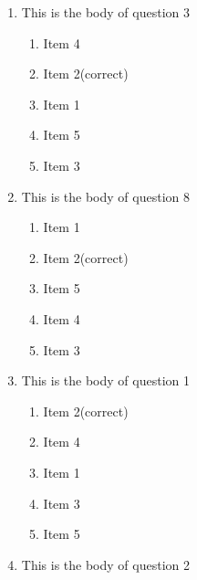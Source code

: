 \documentclass[amsfonts,bezier,leqno,fleqn,12pt,a4paper]{article}
\begin{document}
{{{\begin{large}
\begin{enumerate}
\begin{enumerate}
\item  Item 2\hfill {\small (correct)}
\item  Item 4
\item  Item 1
\item  Item 3
\item  Item 5

\end{enumerate}
\newpage


\item This is the body of question 3
\vspace {0.3in}
\setcounter{equation}{0}

\begin{enumerate}
\item  Item 4
\item  Item 2\hfill {\small (correct)}
\item  Item 1
\item  Item 5
\item  Item 3

\end{enumerate}

\vspace {3.5cm}


\item This is the body of question 8
\vspace {0.3in}
\setcounter{equation}{0}

\begin{enumerate}
\item  Item 1
\item  Item 2\hfill {\small (correct)}
\item  Item 5
\item  Item 4
\item  Item 3

\end{enumerate}
\newpage


\item This is the body of question 1
\vspace {0.3in}
\setcounter{equation}{0}

\begin{enumerate}
\item  Item 2\hfill {\small (correct)}
\item  Item 4
\item  Item 1
\item  Item 3
\item  Item 5

\end{enumerate}

\vspace {3.5cm}


\item This is the body of question 2
\vspace {0.3in}
\setcounter{equation}{0}


\end{enumerate}
\end{large}}}}
\end{document}
